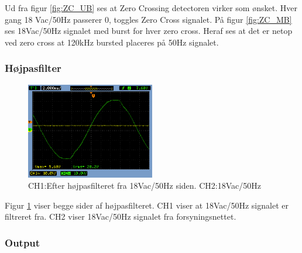 Ud fra figur \ref{fig:ZC_UB} ses at Zero Crossing detectoren virker som ønsket. Hver gang 18 Vac/50Hz passerer 0, toggles Zero Cross signalet.
På figur \ref{fig:ZC_MB} ses 18Vac/50Hz signalet med burst for hver zero cross. Heraf ses at det er netop ved zero cross at 120kHz bursted placeres på 50Hz signalet. 



\subsubsection{Højpasfilter}

\begin{figure}[H]
	\centering
	\includegraphics[width=0.50\textwidth]{billeder/HWTest/Encoder/Encoder_hojpasfilter}
	\caption{CH1:Efter højpasfilteret fra 18Vac/50Hz siden. CH2:18Vac/50Hz}
	\label{fig:HP_SCOP}
\end{figure}

Figur \ref{fig:HP_SCOP} viser begge sider af højpasfilteret. CH1 viser at 18Vac/50Hz signalet er filtreret fra. CH2 viser 18Vac/50Hz signalet fra forsyningsnettet.


\subsubsection{Output}

